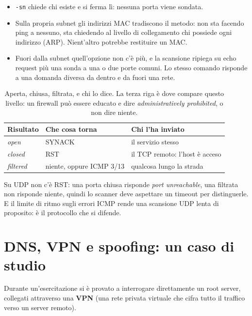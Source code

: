 \begin{itemize}
    \item \texttt{-sn} chiede chi esiste e si ferma lì: nessuna porta viene sondata.
    \item Sulla propria subnet gli indirizzi MAC tradiscono il metodo: non sta facendo ping a nessuno, sta chiedendo al livello
          di collegamento chi possiede ogni indirizzo (ARP). Nient'altro potrebbe restituire un MAC.
    \item Fuori dalla subnet quell'opzione non c'è più, e la scansione ripiega su echo request più una sonda a una o due porte
          comuni. Lo stesso comando risponde a una domanda diversa da dentro e da fuori una rete.
\end{itemize}

\begin{table}[H]
\centering
\begin{tabular}{l l l}
\toprule
\textbf{Risultato} & \textbf{Che cosa torna} & \textbf{Chi l'ha inviato} \\
\midrule
\emph{open}     & SYNACK                   & il servizio stesso \\
\emph{closed}   & RST                      & il TCP remoto: l'host è acceso \\
\emph{filtered} & niente, oppure ICMP 3/13 & qualcosa lungo la strada \\
\bottomrule
\end{tabular}
\caption{Aperta, chiusa, filtrata, e chi lo dice. La terza riga è dove compare questo livello: un firewall può essere
         educato e dire \emph{administratively prohibited}, o non dire niente.}
\end{table}

Su UDP non c'è RST: una porta chiusa risponde \emph{port unreachable}, una filtrata non risponde niente, quindi lo scanner deve
aspettare un timeout per distinguerle. E il limite di ritmo sugli errori ICMP rende una scansione UDP lenta di proposito: è il
protocollo che si difende.

\section{DNS, VPN e spoofing: un caso di studio}

Durante un'esercitazione si è provato a interrogare direttamente un root server, collegati attraverso una
\textbf{VPN} (una rete privata virtuale che cifra tutto il traffico verso un server remoto).

